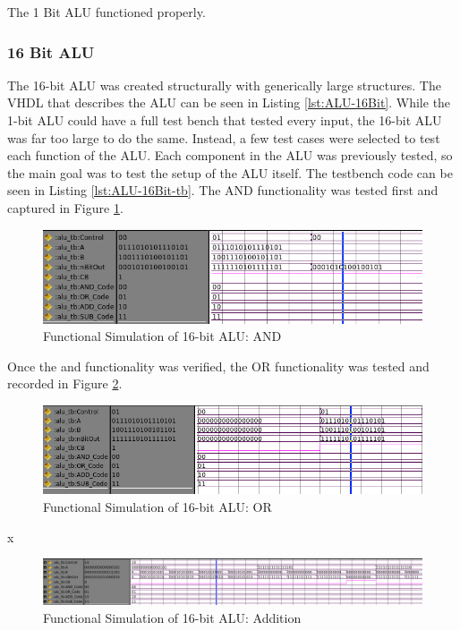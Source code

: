 \documentclass[11pt]{article}
\begin{document}
			The 1 Bit ALU functioned properly.
		
		\subsubsection{16 Bit ALU}
		
			The 16-bit ALU was created structurally with generically large structures. The VHDL that describes the ALU can be seen in Listing \ref{lst:ALU-16Bit}. While the 1-bit ALU could have a full test bench that tested every input, the 16-bit ALU was far too large to do the same. Instead, a few test cases were selected to test each function of the ALU. Each component in the ALU was previously tested, so the main goal was to test the setup of the ALU itself. The testbench code can be seen in Listing \ref{lst:ALU-16Bit-tb}. The AND functionality was tested first and captured in Figure \ref{fig:16-bit-alu-and}.
		
			\begin{figure}[H]
				\centering
				\includegraphics[width=0.7\linewidth]{"Pictures/16 Bit ALU AND"}
				\caption{Functional Simulation of 16-bit ALU: AND}
				\label{fig:16-bit-alu-and}
			\end{figure}
		
			Once the and functionality was verified, the OR functionality was tested and recorded in Figure \ref{fig:16-bit-alu-or}.
		
			\begin{figure}[H]
				\centering
				\includegraphics[width=0.7\linewidth]{"Pictures/16 Bit ALU OR"}
				\caption{Functional Simulation of 16-bit ALU: OR}
				\label{fig:16-bit-alu-or}
			\end{figure}
			
			x
			
			\begin{figure}[H]
				\centering
				\includegraphics[width=0.7\linewidth]{"Pictures/16 Bit ALU Add"}
				\caption{Functional Simulation of 16-bit ALU: Addition}
				\label{fig:16-bit-alu-add}
			\end{figure}
			
\end{document}
